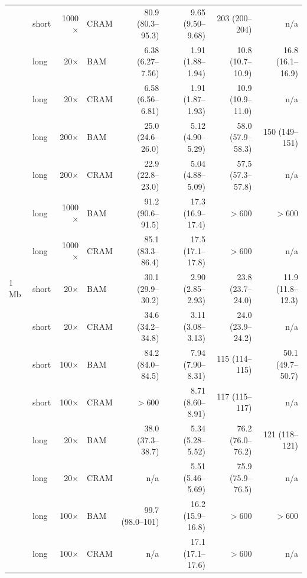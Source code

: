 \begin{tabular}{@{}llrlrrrr@{}}
 & short & 1000$\times$ & CRAM & 80.9 (80.3--95.3) & 9.65 (9.50--9.68) & 203 (200--204) & n/a \\
 & long & 20$\times$ & BAM & 6.38 (6.27--7.56) & 1.91 (1.88--1.94) & 10.8 (10.7--10.9) & 16.8 (16.1--16.9) \\
 & long & 20$\times$ & CRAM & 6.58 (6.56--6.81) & 1.91 (1.87--1.93) & 10.9 (10.9--11.0) & n/a \\
 & long & 200$\times$ & BAM & 25.0 (24.6--26.0) & 5.12 (4.90--5.29) & 58.0 (57.9--58.3) & 150 (149--151) \\
 & long & 200$\times$ & CRAM & 22.9 (22.8--23.0) & 5.04 (4.88--5.09) & 57.5 (57.3--57.8) & n/a \\
 & long & 1000$\times$ & BAM & 91.2 (90.6--91.5) & 17.3 (16.9--17.4) & $>$600 & $>$600 \\
 & long & 1000$\times$ & CRAM & 85.1 (83.3--86.4) & 17.5 (17.1--17.8) & $>$600 & n/a \\
\midrule
1 Mb & short & 20$\times$ & BAM & 30.1 (29.9--30.2) & 2.90 (2.85--2.93) & 23.8 (23.7--24.0) & 11.9 (11.8--12.3) \\
 & short & 20$\times$ & CRAM & 34.6 (34.2--34.8) & 3.11 (3.08--3.13) & 24.0 (23.9--24.2) & n/a \\
 & short & 100$\times$ & BAM & 84.2 (84.0--84.5) & 7.94 (7.90--8.31) & 115 (114--115) & 50.1 (49.7--50.7) \\
 & short & 100$\times$ & CRAM & $>$600 & 8.71 (8.60--8.91) & 117 (115--117) & n/a \\
 & long & 20$\times$ & BAM & 38.0 (37.3--38.7) & 5.34 (5.28--5.52) & 76.2 (76.0--76.2) & 121 (118--121) \\
 & long & 20$\times$ & CRAM & n/a & 5.51 (5.46--5.69) & 75.9 (75.9--76.5) & n/a \\
 & long & 100$\times$ & BAM & 99.7 (98.0--101) & 16.2 (15.9--16.8) & $>$600 & $>$600 \\
 & long & 100$\times$ & CRAM & n/a & 17.1 (17.1--17.6) & $>$600 & n/a \\
\bottomrule
\end{tabular}
